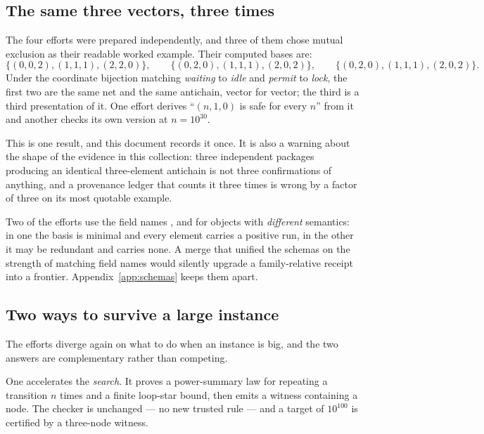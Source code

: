 \subsection{The same three vectors, three times}

The four efforts were prepared independently, and three of them chose mutual
exclusion as their readable worked example. Their computed bases are:
\[
 \{(0,0,2),(1,1,1),(2,2,0)\},\qquad
 \{(0,2,0),(1,1,1),(2,0,2)\},\qquad
 \{(0,2,0),(1,1,1),(2,0,2)\}.
\]
Under the coordinate bijection matching \emph{waiting} to \emph{idle} and
\emph{permit} to \emph{lock}, the first two are the same net and the same
antichain, vector for vector; the third is a third presentation of it. One
effort derives ``$(n,1,0)$ is safe for every $n$'' from it and another checks
its own version at $n=10^{30}$.

This is one result, and this document records it once. It is also a warning
about the shape of the evidence in this collection: three independent packages
producing an identical three-element antichain is not three confirmations of
anything, and a provenance ledger that counts it three times is wrong by a
factor of three on its most quotable example.

\begin{remark}
Two of the efforts use the field names ,  and
 for objects with \emph{different} semantics: in one
the basis is minimal and every element carries a positive run, in the other it
may be redundant and carries none. A merge that unified the schemas on the
strength of matching field names would silently upgrade a family-relative
receipt into a frontier. Appendix~\ref{app:schemas} keeps them apart.
\end{remark}

\subsection{Two ways to survive a large instance}

The efforts diverge again on what to do when an instance is big, and the two
answers are complementary rather than competing.

One accelerates the \emph{search}. It proves a power-summary law for repeating
a transition $n$ times and a finite loop-star bound, then emits a witness
containing a  node. The checker is unchanged --- no new trusted
rule --- and a target of $10^{100}$ is certified by a three-node witness.

